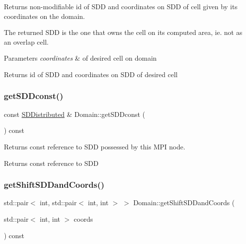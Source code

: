 Returns non-\/modifiable id of S\+DD and coordinates on S\+DD of cell given by its coordinates on the domain. 

The returned S\+DD is the one that owns the cell on its computed area, ie. not as an overlap cell.


\begin{DoxyParams}{Parameters}
{\em coordinates} & of desired cell on domain\\
\hline
\end{DoxyParams}
\begin{DoxyReturn}{Returns}
id of S\+DD and coordinates on S\+DD of desired cell 
\end{DoxyReturn}
\mbox{\label{classDomain_a8172470afa3d3ec4c7202c8ee25ab3b8}} 
\subsubsection{\texorpdfstring{get\+S\+D\+Dconst()}{getSDDconst()}}
{\footnotesize\ttfamily const \mbox{\hyperlink{classSDDistributed}{S\+D\+Distributed}} \& Domain\+::get\+S\+D\+Dconst (\begin{DoxyParamCaption}{ }\end{DoxyParamCaption}) const}



Returns const reference to S\+DD possessed by this M\+PI node. 

\begin{DoxyReturn}{Returns}
const reference to S\+DD 
\end{DoxyReturn}
\mbox{\label{classDomain_a809070249379cd5a3b223a8ac01bfbdb}} 
\subsubsection{\texorpdfstring{get\+Shift\+S\+D\+Dand\+Coords()}{getShiftSDDandCoords()}}
{\footnotesize\ttfamily std\+::pair$<$ int, std\+::pair$<$ int, int $>$ $>$ Domain\+::get\+Shift\+S\+D\+Dand\+Coords (\begin{DoxyParamCaption}\item[{std\+::pair$<$ int, int $>$}]{coords }\end{DoxyParamCaption}) const}



